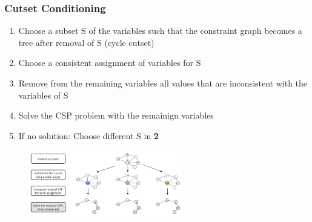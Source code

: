 \documentclass[
../../EiKI_Summary.tex,
]
{subfiles}
\begin{document}
\subsubsection*{Cutset Conditioning}
\begin{enumerate}
    \item Choose a subset S of the variables such that the constraint graph becomes a tree after removal of S (cycle cutset)
    \item Choose a consistent assignment of variables for S
    \item Remove from the remaining variables all values that are inconsistent with the variables of S
    \item Solve the CSP problem with the remainign variables
    \item If no solution: Choose different S in \textbf{2}
\end{enumerate}

\begin{figure}
    [H]
    \centering
    \includegraphics[width=0.6\textwidth]{Pics/05/CutsetConditioning.png}
\end{figure}
\end{document}
